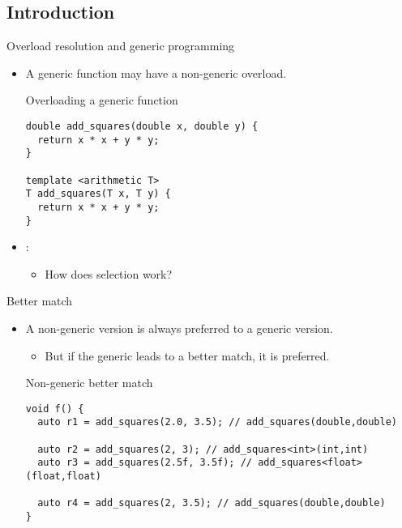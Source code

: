 \subsection{Introduction}

\begin{frame}[t,fragile]{Overload resolution and generic programming}
\begin{itemize}
  \item A generic function may have a non-generic overload.

\begin{block}{Overloading a generic function}
\begin{lstlisting}
double add_squares(double x, double y) {
  return x * x + y * y;
}

template <arithmetic T>
T add_squares(T x, T y) {
  return x * x + y * y;
}
\end{lstlisting}
\end{block}

  \item {}:
    \begin{itemize}
      \item How does selection work?
    \end{itemize}

\end{itemize}
\end{frame}

\begin{frame}[t,fragile]{Better match}
\begin{itemize}
  \item A non-generic version is always preferred to a generic version.
    \begin{itemize}
      \item But if the generic leads to a better match, it is preferred.
    \end{itemize}

\begin{block}{Non-generic better match}
\begin{lstlisting}
void f() {
  auto r1 = add_squares(2.0, 3.5); // add_squares(double,double)

  auto r2 = add_squares(2, 3); // add_squares<int>(int,int)
  auto r3 = add_squares(2.5f, 3.5f); // add_squares<float>(float,float)

  auto r4 = add_squares(2, 3.5); // add_squares(double,double)
}
\end{lstlisting}
\end{block}
\end{itemize}
\end{frame}

